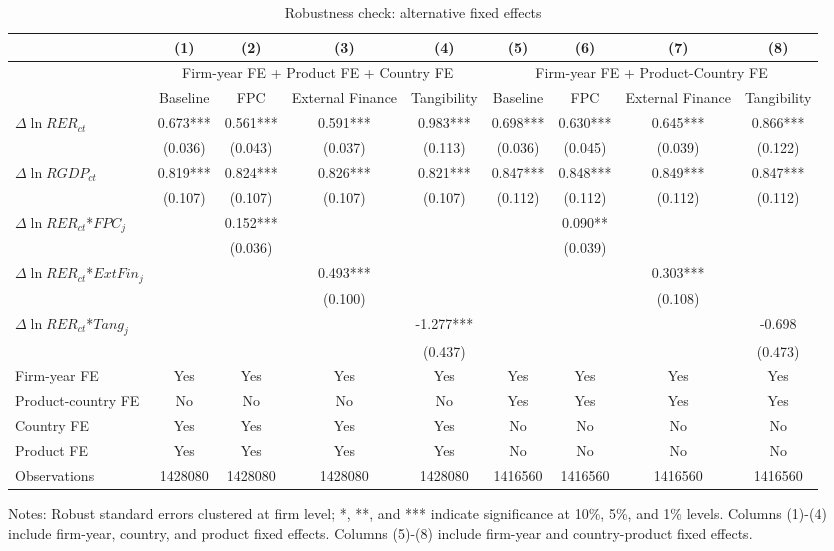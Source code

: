 \documentclass[12pt]{article}
\begin{document}
\begin{table}
	\centering
	\caption{Robustness check: alternative fixed effects}
	\begin{threeparttable}
		\begin{tabular}{lcccccccc}
			\toprule
			& (1)   & (2)   & (3)   & (4) &  (5)  &  (6)  & (7)  & (8)\\
			\midrule
			& \multicolumn{4}{c}{Firm-year FE + Product FE + Country FE} & \multicolumn{4}{c}{Firm-year FE + Product-Country FE}\\
			& Baseline & FPC   & External Finance & Tangibility & Baseline & FPC & External Finance & Tangibility\\
			\midrule
			$\Delta \ln RER_{ct}$ & 0.673*** & 0.561*** & 0.591*** & 0.983*** & 0.698*** & 0.630*** & 0.645*** & 0.866*** \\
                & (0.036) & (0.043) & (0.037) & (0.113) & (0.036) & (0.045) & (0.039) & (0.122) \\
			$\Delta \ln RGDP_{ct}$ & 0.819*** & 0.824*** & 0.826*** & 0.821*** & 0.847*** & 0.848*** & 0.849*** & 0.847*** \\
			& (0.107) & (0.107) & (0.107) & (0.107) & (0.112) & (0.112) & (0.112) & (0.112) \\
			$\Delta \ln RER_{ct}$*$FPC_{j}$ &  & 0.152*** &       &       &       & 0.090** &       &  \\
			&  & (0.036) &       &       &       & (0.039) &       &  \\
			$\Delta \ln RER_{ct}$*$ExtFin_{j}$ &   &       & 0.493*** &       &       &       & 0.303*** &  \\
			&  &       & (0.100) &       &       &       & (0.108) &  \\
			$\Delta \ln RER_{ct}$*$Tang_{j}$ &   &       &       & -1.277*** &       &       &       & -0.698 \\
			&   &       &       & (0.437) &       &       &       & (0.473) \\
			Firm-year FE  &  Yes   & Yes   & Yes & Yes & Yes & Yes & Yes & Yes\\
			Product-country FE & No & No & No & No & Yes & Yes & Yes & Yes\\
			Country FE &  Yes   & Yes   & Yes   & Yes & No & No & No & No\\
			Product FE &  Yes   & Yes   & Yes   & Yes & No & No & No & No\\
			Observations & 1428080 & 1428080 & 1428080 & 1428080 & 1416560 & 1416560 & 1416560 & 1416560\\
			\bottomrule
		\end{tabular}
		\begin{tablenotes}
			\footnotesize
			\item[Notes:] Robust standard errors clustered at firm level; *, **, and *** indicate significance at 10\%, 5\%, and 1\% levels. Columns (1)-(4) include firm-year, country, and product fixed effects.  Columns (5)-(8) include firm-year and country-product fixed effects.
		\end{tablenotes}
	\end{threeparttable}
	\label{tab.robust.fe}
\end{table}
\end{document}
